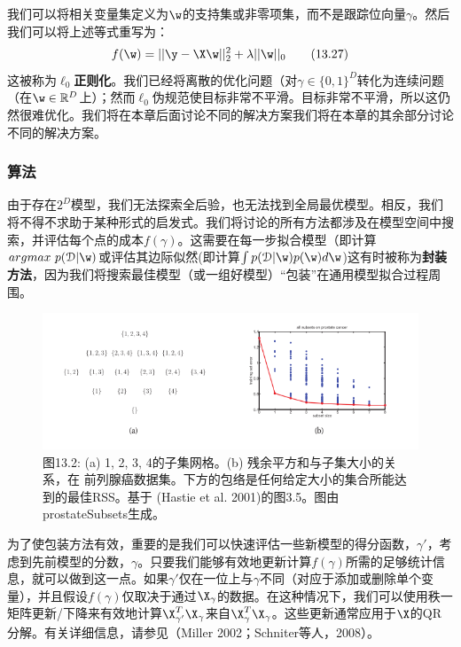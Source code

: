 \documentclass[a4paper]{article}
\begin{document}
我们可以将相关变量集定义为$\w$的支持集或非零项集，而不是跟踪位向量$\gamma$。然后我们可以将上述等式重写为： 
\begin{equation}
	f(\w)=||\y-\X\w||_2^2+\lambda||\w||_0\tag{13.27}
\end{equation}
这被称为\textbf{$\ell_0$正则化}。我们已经将离散的优化问题（对$\gamma\in \{0,1\}^D$转化为连续问题（在$\w\in \mathbb{R}^D$上）；然而$\ell_0$伪规范使目标非常不平滑。目标非常不平滑，所以这仍然很难优化。我们将在本章后面讨论不同的解决方案我们将在本章的其余部分讨论不同的解决方案。

\subsubsection{算法}
由于存在$2^D$模型，我们无法探索全后验，也无法找到全局最优模型。相反，我们将不得不求助于某种形式的启发式。我们将讨论的所有方法都涉及在模型空间中搜索，并评估每个点的成本$f(\gamma)$。这需要在每一步拟合模型（即计算$argmax\ p(\mathcal{D}|\w)$或评估其边际似然(即计算$\int p(\mathcal{D}|\w)p(\w)d\w$)这有时被称为\textbf{封装方法}，因为我们将搜索最佳模型（或一组好模型）“包装”在通用模型拟合过程周围。 

\begin{figure}[h]
	\centering
	\includegraphics[width=0.9\linewidth]{fig13/figure2}
	\caption*{图13.2: (a) {1, 2, 3, 4}的子集网格。(b) 残余平方和与子集大小的关系，在
		前列腺癌数据集。下方的包络是任何给定大小的集合所能达到的最佳RSS。基于
		(Hastie et al. 2001)的图3.5。图由prostateSubsets生成。}
\end{figure}
为了使包装方法有效，重要的是我们可以快速评估一些新模型的得分函数，$\gamma'$，考虑到先前模型的分数，$\gamma$。只要我们能够有效地更新计算$f(\gamma)$所需的足够统计信息，就可以做到这一点。如果$\gamma'$仅在一位上与$\gamma$不同（对应于添加或删除单个变量），并且假设$f(\gamma)$仅取决于通过$\X_\gamma$的数据。在这种情况下，我们可以使用秩一矩阵更新/下降来有效地计算$\X_{\gamma'}^T\X_\gamma$来自$\X_{\gamma}^T\X_\gamma$。这些更新通常应用于$\X$的QR分解。有关详细信息，请参见（Miller 2002；Schniter等人，2008）。 
\end{document}

